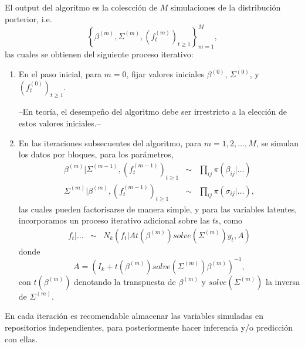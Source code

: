 \documentclass[12pt]{exam}
\begin{document}
El output del algoritmo es la colescci\'on de $M$ simulaciones de la distribuci\'on porterior, i.e. 
$$
\left\{\beta^{(m)},\Sigma^{(m)},(f_t^{(m)})_{t\geq 1}\right\}_{m=1}^{M},
$$
las cuales se obtienen del siguiente proceso iterativo:
\begin{enumerate}
\item En el paso inicial, para $m=0$, fijar valores iniciales $\beta^{(0)}$, $\Sigma^{(0)}$, y $(f_t^{(0)})_{t\geq 1}$.

--En teor\'ia, el desempe\~no del algoritmo debe ser irrestricto a la elecci\'on de estos valores iniciales.--

\item En las iteraciones subsecuentes del algoritmo, para $m=1,2,\ldots,M$, se simulan los datos por bloques, para los par\'ametros,
\begin{eqnarray}
\beta^{(m)}|\Sigma^{(m-1)}, (f_t^{(m-1)})_{t\geq 1} 
	&\sim & \prod_{ij}\pi(\beta_{ij}|\ldots)\\
\Sigma^{(m)}|\beta^{(m)}, (f_t^{(m-1)})_{t\geq 1} 
	&\sim & \prod_{ij}\pi(\sigma_{ij}|\ldots),
\end{eqnarray}
las cuales pueden factorisarse de manera simple, y para las variables latentes, incorporamos un proceso iterativo adicional sobre las $t$s, como
\begin{eqnarray}
f_t|\ldots & \sim & N_{k}\left(f_t|
A t(\beta^{(m)})solve(\Sigma^{(m)})y_t,
A
\right)
\end{eqnarray}
donde $$A=\left(I_{k}+t(\beta^{(m)})solve(\Sigma^{(m)})\beta^{(m)}\right)^{-1},$$
con $t(\beta^{(m)})$ denotando la transpuesta de $\beta^{(m)}$ y $solve(\Sigma^{(m)})$ la inversa de $\Sigma^{(m)}$.
\end{enumerate}
En cada iteraci\'on es recomendable almacenar las variables simuladas en repositorios independientes, para posteriormente hacer inferencia y/o predicci\'on con ellas.
\end{document}
